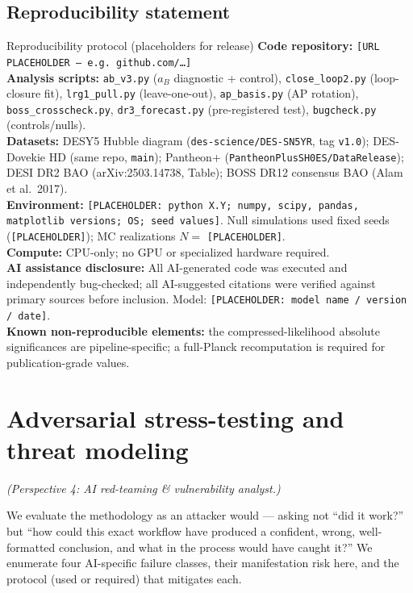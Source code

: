 \documentclass[11pt]{article}
\begin{document}
\subsection*{Reproducibility statement}
\begin{keybox}{Reproducibility protocol (placeholders for release)}
\textbf{Code repository:} \texttt{[URL PLACEHOLDER --- e.g.\ github.com/\dots]} \\
\textbf{Analysis scripts:} \texttt{ab\_v3.py} ($a_B$ diagnostic + control), \texttt{close\_loop2.py} (loop-closure fit), \texttt{lrg1\_pull.py} (leave-one-out), \texttt{ap\_basis.py} (AP rotation), \texttt{boss\_crosscheck.py}, \texttt{dr3\_forecast.py} (pre-registered test), \texttt{bugcheck.py} (controls/nulls). \\
\textbf{Datasets:} DESY5 Hubble diagram (\texttt{des-science/DES-SN5YR}, tag \texttt{v1.0}); DES-Dovekie HD (same repo, \texttt{main}); Pantheon+ (\texttt{PantheonPlusSH0ES/DataRelease}); DESI DR2 BAO (arXiv:2503.14738, Table); BOSS DR12 consensus BAO (Alam et al.\ 2017). \\
\textbf{Environment:} \texttt{[PLACEHOLDER: python X.Y; numpy, scipy, pandas, matplotlib versions; OS; seed values]}. Null simulations used fixed seeds (\texttt{[PLACEHOLDER]}); MC realizations $N=$ \texttt{[PLACEHOLDER]}. \\
\textbf{Compute:} CPU-only; no GPU or specialized hardware required. \\
\textbf{AI assistance disclosure:} All AI-generated code was executed and independently bug-checked; all AI-suggested citations were verified against primary sources before inclusion. Model: \texttt{[PLACEHOLDER: model name / version / date]}. \\
\textbf{Known non-reproducible elements:} the compressed-likelihood absolute significances are pipeline-specific; a full-Planck recomputation is required for publication-grade values.
\end{keybox}

\section{Adversarial stress-testing and threat modeling}
\label{sec:redteam}
\emph{(Perspective 4: AI red-teaming \& vulnerability analyst.)}

We evaluate the methodology as an attacker would --- asking not ``did it work?'' but ``how could this exact workflow have produced a confident, wrong, well-formatted conclusion, and what in the process would have caught it?'' We enumerate four AI-specific failure classes, their manifestation risk here, and the protocol (used or required) that mitigates each.
\end{document}
